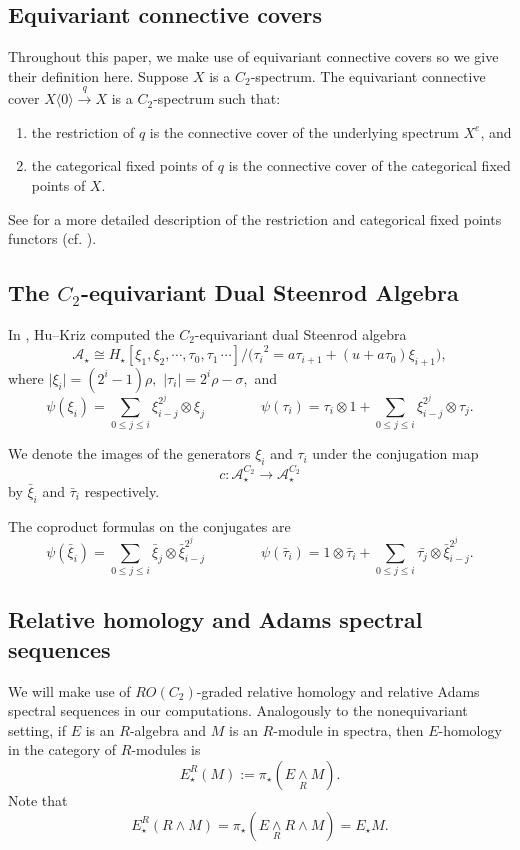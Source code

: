 \documentclass{amsart}
\theoremstyle{plain}
\numberwithin{equation}{section}
\numberwithin{figure}{section}
\newcommand{\cA}{{\mathcal A}}
\newcommand{\0}{\langle 0 \rangle }
\begin{document}
 \subsection{Equivariant connective covers}
Throughout this paper, we make use of equivariant connective covers so we give their definition here. Suppose $X$ is a $C_2$-spectrum. The equivariant connective cover $X \langle 0 \rangle \xrightarrow{q} X$ is a $C_2$-spectrum such that:
\begin{enumerate}
    \item the restriction of $q$ is the connective cover of the underlying spectrum $X^e$, and
    \item the categorical fixed points of $q$ is the connective cover of the categorical fixed points of $X.$ 
\end{enumerate}
See \cite[p. 25]{GuillouHillIsaksenRavenel2020} for a more detailed description of the restriction and categorical fixed points functors (cf. \cite[Proposition~3.3]{Lewis95}).

\subsection{The $C_2$-equivariant Dual Steenrod Algebra} In \cite{HuKriz2001}, Hu--Kriz computed the $C_2$-equivariant dual Steenrod algebra
$$\cA_\star \cong H_\star [{\xi}_1, {\xi}_2, \cdots, {\tau}_{0}, {\tau}_{1}\, \cdots ] \slash {({\tau}_i}^2 = a {\tau}_{i + 1} + (u + a {\tau}_0) \xi_{i + 1} ),$$
where $\vert \xi_{i} \vert = (2^i - 1)\rho,$ $\vert \tau_i \vert = 2^i \rho - \sigma,$ and 
$$\psi(\xi_i) = \sum_{0 \leq j \leq i} \xi_{i - j}^{2^j} \otimes \xi_j \qquad \qquad \psi(\tau_i) = \tau_i \otimes 1 + \sum_{0 \leq j \leq i} \xi_{i - j}^{2^j} \otimes \tau_j.  $$

We denote the images of the generators $\xi_i$ and $\tau_i$ under the conjugation map 
$$c: \cA_\star^{C_2} \to \cA_\star^{C_2}$$ 
by $\bar{\xi}_i$ and $\bar{\tau}_i$ respectively. 

The coproduct formulas on the conjugates are 
$$\psi(\bar{\xi}_i) = \sum_{0 \leq j \leq i} \bar{\xi}_j \otimes \bar{\xi}_{i - j}^{2^j} \qquad \qquad \psi (\bar{\tau}_i ) = 1 \otimes \bar{\tau}_i  + \sum_{0 \leq j \leq i} \bar{\tau_j} \otimes \bar{\xi}_{i - j}^{2^j}.$$

\subsection{Relative homology and Adams spectral sequences} \label{sec:Relative}
We will make use of $RO(C_2)$-graded relative homology and relative Adams spectral sequences in our computations. Analogously to the nonequivariant setting, if $E$ is an $R$-algebra and $M$ is an $R$-module in spectra, then $E$-homology in the category of $R$-modules is 
$$E_\star^R (M) := \pi_\star (E \underset{R}{\wedge} M).$$
Note that
$$E^R_\star(R \wedge M) = \pi_\star(E \underset{R}{\wedge} R \wedge M) = E_{\star}M.$$
\end{document}
